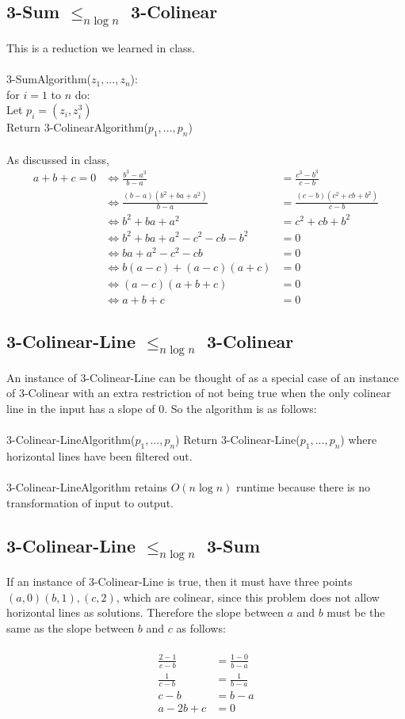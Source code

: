 \documentclass[letterpaper,notitlepage,twoside]{article}
\renewcommand{\iff}{\Leftrightarrow} %
\newcommand\tab[1][1cm]{\hspace*{#1}} %
\begin{document}
\subsection*{3-Sum $\leq_{n \log n}$ 3-Colinear}
This is a reduction we learned in class.
\\\\
3-SumAlgorithm($z_1,...,z_n$):\\
\tab for $i = 1$ to $n$ do:\\
\tab\tab Let $p_i = (z_i, z_i^3)$\\
\tab Return 3-ColinearAlgorithm($p_1,...,p_n$)
\\\\
As discussed in class,
\begin{align*}
a + b + c = 0 &\iff \frac{b^3 - a^3}{b - a} &= \frac{c^3 - b^3}{c - b}\\
&\iff \frac{(b - a)(b^2 + ba + a^2)}{b - a} &= \frac{(c - b)(c^2 + cb + b^2)}{c - b}\\
&\iff b^2 + ba + a^2 &= c^2 + cb + b^2\\
&\iff b^2 + ba + a^2 - c^2 - cb - b^2 &= 0\\
&\iff ba + a^2 - c^2 - cb &= 0\\
&\iff b(a - c) + (a - c)(a + c) &= 0\\
&\iff (a - c)(a + b + c) &= 0\\
&\iff a + b + c &= 0
\end{align*}

\subsection*{3-Colinear-Line $\leq_{n \log n}$  3-Colinear}
An instance of 3-Colinear-Line can be thought of as a special case of an instance of 3-Colinear with an extra restriction of not being true when the only colinear line in the input has a slope of 0. So the algorithm is as follows:
\\\\
3-Colinear-LineAlgorithm($p_1,...,p_n$)
\tab Return 3-Colinear-Line($p_1,...,p_n$) where horizontal lines have been filtered out.
\\\\
3-Colinear-LineAlgorithm retains $O(n \log n)$ runtime because there is no transformation of input to output.

\subsection{3-Colinear-Line $\leq_{n \log n}$ 3-Sum}
If an instance of 3-Colinear-Line is true, then it must have three points $(a, 0) (b, 1), (c, 2)$, which are colinear, since this problem does not allow horizontal lines as solutions. Therefore the slope between $a$ and $b$ must be the same as the slope between $b$ and $c$ as follows:
\\\\
\begin{align*}
\frac{2 - 1}{c - b} &= \frac{1 - 0}{b - a}\\
\frac{1}{c - b} &= \frac{1}{b - a}\\
c - b &= b - a\\
a - 2b + c &= 0
\end{align*}
\end{document}
